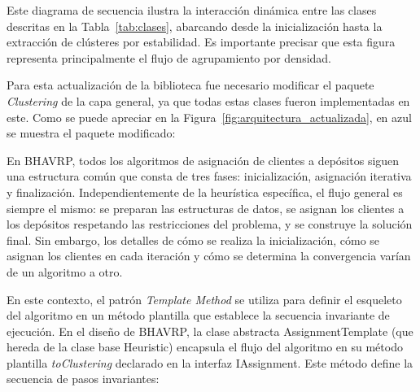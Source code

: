 

Este diagrama de secuencia ilustra la interacción dinámica entre las clases descritas en la Tabla~\ref{tab:clases}, abarcando desde la inicialización hasta la extracción de clústeres por estabilidad. Es importante precisar que esta figura representa principalmente el flujo de agrupamiento por densidad.

Para esta actualizaci\'on de la biblioteca fue necesario modificar el paquete \textit{Clustering} de la capa general, ya que todas estas clases fueron implementadas en este. Como se puede apreciar en la Figura~\ref{fig:arquitectura_actualizada}, en azul se muestra el paquete modificado:


En BHAVRP, todos los algoritmos de asignaci\'on de clientes a dep\'ositos siguen una estructura com\'un que consta de tres fases: inicializaci\'on, asignaci\'on iterativa y finalizaci\'on. Independientemente de la heur\'istica espec\'ifica, el flujo general es siempre el mismo: se preparan las estructuras de datos, se asignan los clientes a los dep\'ositos respetando las restricciones del problema, y se construye la soluci\'on final. Sin embargo, los detalles de c\'omo se realiza la inicializaci\'on, c\'omo se asignan los clientes en cada iteraci\'on y c\'omo se determina la convergencia var\'ian de un algoritmo a otro.

En este contexto, el patr\'on \textit{Template Method} se utiliza para definir el esqueleto del algoritmo en un m\'etodo plantilla que establece la secuencia invariante de ejecuci\'on. En el dise\~no de BHAVRP, la clase abstracta AssignmentTemplate (que hereda de la clase base Heuristic) encapsula el flujo del algoritmo en su m\'etodo plantilla \textit{toClustering} declarado en la interfaz IAssignment. Este m\'etodo define la secuencia de pasos invariantes:

